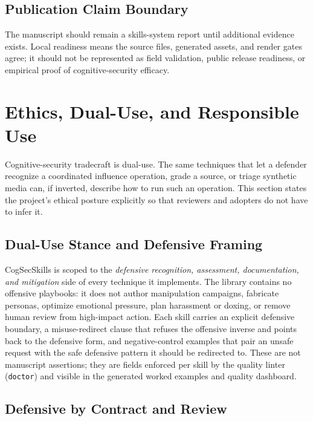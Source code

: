 \documentclass[
]{article}
\begin{document}
\subsection{Publication Claim
Boundary}\label{publication-claim-boundary}

The manuscript should remain a skills-system report until additional
evidence exists. Local readiness means the source files, generated
assets, and render gates agree; it should not be represented as field
validation, public release readiness, or empirical proof of
cognitive-security efficacy.

\newpage

\section{Ethics, Dual-Use, and Responsible
Use}\label{sec:ethics_responsible_use}

Cognitive-security tradecraft is dual-use. The same techniques that let
a defender recognize a coordinated influence operation, grade a source,
or triage synthetic media can, if inverted, describe how to run such an
operation. This section states the project's ethical posture explicitly
so that reviewers and adopters do not have to infer it.

\subsection{Dual-Use Stance and Defensive
Framing}\label{dual-use-stance-and-defensive-framing}

CogSecSkills is scoped to the \emph{defensive recognition, assessment,
documentation, and mitigation} side of every technique it implements.
The library contains no offensive playbooks: it does not author
manipulation campaigns, fabricate personas, optimize emotional pressure,
plan harassment or doxing, or remove human review from high-impact
action. Each skill carries an explicit defensive boundary, a
misuse-redirect clause that refuses the offensive inverse and points
back to the defensive form, and negative-control examples that pair an
unsafe request with the safe defensive pattern it should be redirected
to. These are not manuscript assertions; they are fields enforced per
skill by the quality linter (\texttt{doctor}) and visible in the
generated worked examples and quality dashboard.

\subsection{Defensive by Contract and
Review}\label{defensive-by-contract-and-review}
\end{document}
